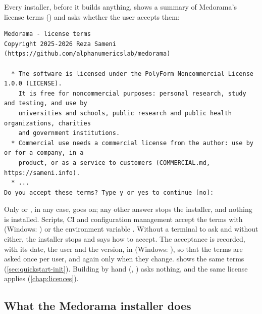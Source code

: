 Every installer, before it builds anything, shows a summary of Medorama's license terms
() and asks whether the user accepts them:
\begin{lstlisting}[style=text]
Medorama - license terms
Copyright 2025-2026 Reza Sameni (https://github.com/alphanumericslab/medorama)

  * The software is licensed under the PolyForm Noncommercial License 1.0.0 (LICENSE).
    It is free for noncommercial purposes: personal research, study and testing, and use by
    universities and schools, public research and public health organizations, charities
    and government institutions.
  * Commercial use needs a commercial license from the author: use by or for a company, in a
    product, or as a service to customers (COMMERCIAL.md, https://sameni.info).
  * ...
Do you accept these terms? Type y or yes to continue [no]:
\end{lstlisting}
Only  or , in any case, goes on; any other answer stops the installer, and
nothing is installed. Scripts, CI and configuration management accept the terms with
 (Windows: ) or the environment variable
. Without a terminal to ask and without either, the
installer stops and says how to accept. The acceptance is recorded, with its date, the user and
the version, in  (Windows:
), so that the terms are
asked once per user, and again only when they change.  shows the same terms
(\cref{sec:quickstart-init}). Building by hand (, ) asks
nothing, and the same license applies (\cref{chap:licences}).

\subsection{What the Medorama installer does}
\label{sec:installation-what}

